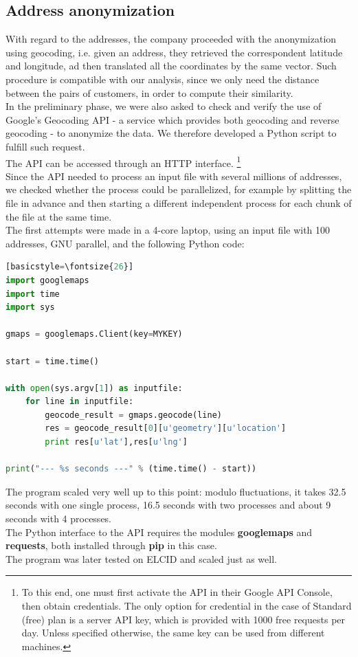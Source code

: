 \documentclass[a4paper,11pt]{book}
\begin{document}
\subsection{Address anonymization}
With regard to the addresses, the company proceeded with the anonymization using geocoding, i.e. given an address, they retrieved the correspondent latitude and longitude, ad then translated all the coordinates by the same vector. Such procedure is compatible with our analysis, since we only need the distance between the pairs of customers, in order to compute their similarity.\\
In the preliminary phase, we were also asked to check and verify the use of Google’s Geocoding API - a service which provides both geocoding and reverse geocoding - to anonymize the data. We therefore developed a Python script to fulfill such request.\\
The API can be accessed through an HTTP interface. \footnote{To this end, one must first activate the API in their Google API Console\cite{cons}, then obtain credentials. The only option for credential in the case of Standard (free) plan is a server API key\cite{key}, which is provided with 1000 free requests per day. Unless specified otherwise, the same key can be used from different machines.}\\

Since the API needed to process an input file with several millions of addresses, we checked whether the process could be parallelized, for example by splitting the file in advance and then starting a different independent process for each chunk of the file at the same time.\\
The first attempts were made in a 4-core laptop, using an input file with 100 addresses, GNU parallel, and the following Python code:
\begin{center}
\begin{lstlisting}[language=Python][basicstyle=\fontsize{26}]
import googlemaps
import time
import sys

gmaps = googlemaps.Client(key=MYKEY)

start = time.time()

with open(sys.argv[1]) as inputfile:
    for line in inputfile:
        geocode_result = gmaps.geocode(line)
        res = geocode_result[0][u'geometry'][u'location']
        print res[u'lat'],res[u'lng']

print("--- %s seconds ---" % (time.time() - start))

\end{lstlisting}
\end{center}
The program scaled very well up to this point: modulo fluctuations, it takes 32.5 seconds with one single process, 16.5 seconds with two processes and about 9 seconds with 4 processes.\\
The Python interface to the API requires the modules \textbf{googlemaps} and \textbf{requests}, both installed through \textbf{pip} in this case.\\
The program was later tested on ELCID and scaled just as well.
\end{document}
